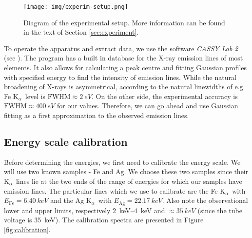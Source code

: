 \documentclass[11pt,a4paper,twoside,onecolumn]{article}
\newcommand{\Kalpha}{$\mathrm{K}_\alpha$~}
\begin{document}
\begin{figure}[!htbp]
    \centering
    \texttt{[image: img/experim-setup.png]}
    \caption{Diagram of the experimental setup. More information can be found in the text of Section \ref{sec:experiment}.}\label{fig:experim-setup}
\end{figure}

To operate the apparatus and extract data, we use the software \emph{CASSY Lab 2} (see \cite{cassylab2}). The program has a built in database for the X-ray emission lines of most elements. It also allows for calculating a peak centre and fitting Gaussian profiles with specified energy to find the intensity of emission lines. While the natural broadening of X-rays is asymmetrical, according to \cite{Krause1979} the natural linewidths of e.g. Fe \Kalpha level is $\mathrm{FWHM} \approx \qty{2}{eV}$. On the other side, the experimental accuracy is $\mathrm{FWHM} \approx \qty{400}{eV}$ for our values. Therefore, we can go ahead and use Gaussian fitting as a first approximation to the observed emission lines.

\subsection{Energy scale calibration}
Before determining the energies, we first need to calibrate the energy scale. We will use two known samples - Fe and Ag. We choose these two samples since their \Kalpha lines lie at the two ends of the range of energies for which our samples have emission lines. The particular lines which we use to calibrate are the Fe \Kalpha with $E_\mathrm{Fe} = \qty{6.40}{keV}$ and the Ag \Kalpha with $E_\mathrm{Ag} = 
\qty{22.17}{keV}$. Also note the observational lower and upper limits, respectively \qtyrange{2}{4}{keV} and $\approx \qty{35}{keV}$ (since the tube voltage is \qty{35}{keV}). The calibration spectra are presented in Figure \ref{fig:calibration}.
\end{document}
